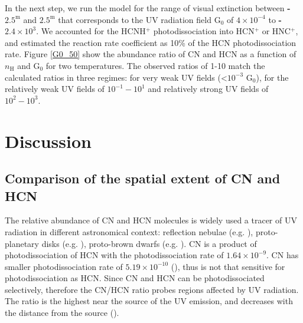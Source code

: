 \documentclass{aa}
\begin{document}
In the next step, we run the model for the
range of visual extinction between \textbf{-$2.5^{\mathrm{m}}$} and $2.5^{\mathrm{m}}$ that corresponds to
the UV radiation field G$_0$ of $4\times 10^{-4}$ to \textbf{-$2.4\times 10^{3}$}. We accounted for the HCNH$^+$ photodissociation into HCN$^+$ or HNC$^+$,
and estimated the reaction rate coefficient as 10\% of the HCN photodissociation rate.
Figure \ref{G0_50} show the abundance ratio of CN and HCN as a function of
 $n_\mathrm{H}$ and G$_0$ for two temperatures. The observed ratios 
of 1-10 match the calculated ratios in three regimes: for very weak UV fields (<$10^{-3}$ G$_0$),
  for the relatively weak UV fields of $10^{-1}-10^1$ and relatively strong UV fields of $10^{2}-10^3$.

%
\section{Discussion}
\subsection{Comparison of the spatial extent of CN and HCN}
The relative abundance of CN and HCN molecules is widely used a tracer of UV radiation in different
astronomical context: reflection nebulae (e.g. \citealt{Fue95}), proto-planetary disks (e.g.
\citealt{Cha12}), proto-brown dwarfs (e.g. \citealt{Ria18}). CN is a product of photodissociation of
HCN with the photodissociation rate of $1.64\times10^{-9}$. CN has smaller photodissociation rate of
$5.19\times10^{-10}$ (\citealt{Hea17}), thus is not that sensitive for photodissociation as HCN.
Since CN and HCN can be photodissociated selectively, therefore the CN/HCN ratio probes regions
affected by UV radiation. The ratio is the highest near the source of the UV emission, and decreases
with the distance from the source (\citealt{Fue93}). 
\end{document}
